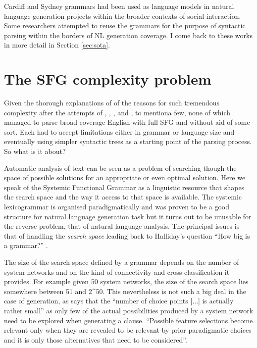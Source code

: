 Cardiff and Sydney grammars had been used as language models in natural language generation projects within 
the broader contexts of social interaction. Some researchers \citep{Kasper1988, ODonoghue1991a, ODonnell1993, Souter1996, Day2007} attempted to reuse the grammars for the purpose of syntactic parsing within the borders of NL generation coverage. I come back to these works in more detail in Section \ref{sec:sota}.

\section{The SFG complexity problem}
Given the thorough explanations of \citet{Bateman2008} of the reasons for such tremendous complexity after the attempts of \citet{Kasper1988}, \citet{Kay1985}, \citet{ODonoghue1991a}, \citet{ODonnell1993} and \citet{Day2007}, to mentiona few, none of which managed to parse broad coverage English with full SFG and without aid of some sort. Each had to accept limitations either in grammar or language size and eventually using simpler syntactic trees as a starting point of the parsing process. So what is it about? 

Automatic analysis of text can be seen as a problem of searching though the space of possible solutions for an appropriate or even optimal solution. Here we speak of the Systemic Functional Grammar as a linguistic resource that shapes the search space and the way it access to that space is available. The systemic lexicogrammar is organised paradigmatically and was proven to be a good structure for natural language generation task but it turns out to be unusable for the reverse problem, that of natural language analysis. The principal issues is that of handling the \textit{search space} leading back to Halliday's question ``How big is a grammar?'' \citep{Halliday66-deep}.

The size of the search space defined by a grammar depends on the number of system networks and on the kind of connectivity and cross-classification it provides. For example given 50 system networks, the size of the search space lies somewhere between 51 and 2^{50}. This nevertheless is not such a big deal in the case of generation, as \citet{Halliday96-grammatics} says that the ``number of choice points [...] is actually rather small'' as only few of the actual possibilities produced by a system network need to be explored when generating a clause. ``Possible feature selections become relevant only when they are revealed to be relevant by prior paradigmatic choices and it is only those alternatives that need to be considered''\citep{Bateman2008}.

